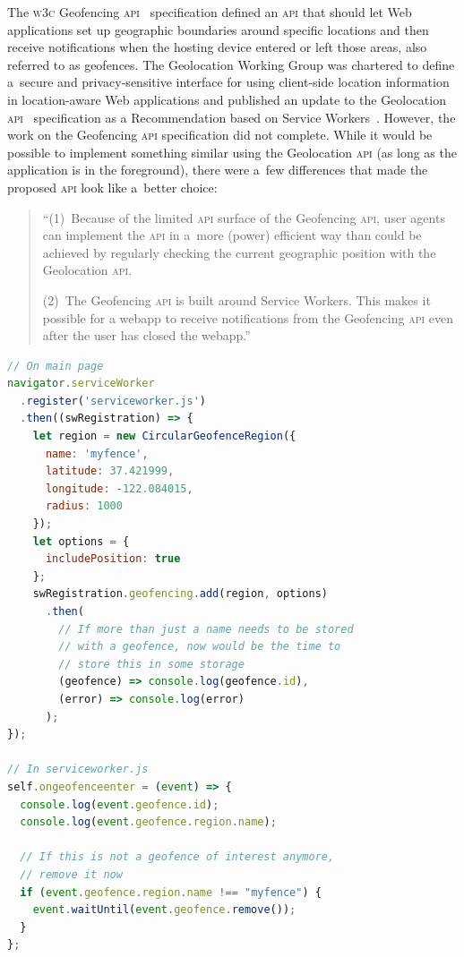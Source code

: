 \documentclass[sigconf,hyphens]{acmart}
\begin{document}
The \textsc{w3c} Geofencing \textsc{api}~\cite{kruisselbrink2017geofencing} specification
defined an \textsc{api} that should let Web applications set up geographic boundaries
around specific locations and then receive notifications when the hosting device
entered or left those areas, also referred to as geofences.
The Geolocation Working Group was chartered to define a~secure and privacy-sensitive interface
for using client-side location information in location-aware Web applications
and published an update to the Geolocation \textsc{api}~\cite{popescu2016geolocation}
specification as a Recommendation based on Service Workers~\cite{russell2017serviceworkers}.
However, the work on the Geofencing \textsc{api} specification did not complete.
While it would be possible to implement something similar using the Geolocation \textsc{api}
(as long as the application is in the foreground),
there were a~few differences that made the proposed \textsc{api} look like a~better choice:

\begin{quote}
``(1)~Because of the limited \textsc{api} surface of the Geofencing \textsc{api},
user agents can implement the \textsc{api} in a~more (power) efficient way
than could be achieved by regularly checking the current geographic position with the Geolocation \textsc{api}.

(2)~The Geofencing \textsc{api} is built around Service Workers.
This makes it possible for a webapp to receive notifications from the Geofencing \textsc{api}
even after the user has closed the webapp.''	
\end{quote}

\begin{lstlisting}[caption={Geofencing \textsc{api} (conceived example)},
  label=code:geofence, language=JavaScript, float=h] 
// On main page
navigator.serviceWorker
  .register('serviceworker.js')
  .then((swRegistration) => {
    let region = new CircularGeofenceRegion({
      name: 'myfence',
      latitude: 37.421999,
      longitude: -122.084015,
      radius: 1000
    });
    let options = {
      includePosition: true
    };
    swRegistration.geofencing.add(region, options)
      .then(
        // If more than just a name needs to be stored
        // with a geofence, now would be the time to
        // store this in some storage
        (geofence) => console.log(geofence.id),
        (error) => console.log(error)
      );
});

// In serviceworker.js
self.ongeofenceenter = (event) => {
  console.log(event.geofence.id);
  console.log(event.geofence.region.name);

  // If this is not a geofence of interest anymore,
  // remove it now
  if (event.geofence.region.name !== "myfence") {
    event.waitUntil(event.geofence.remove());
  }
};
\end{lstlisting}
\end{document}
